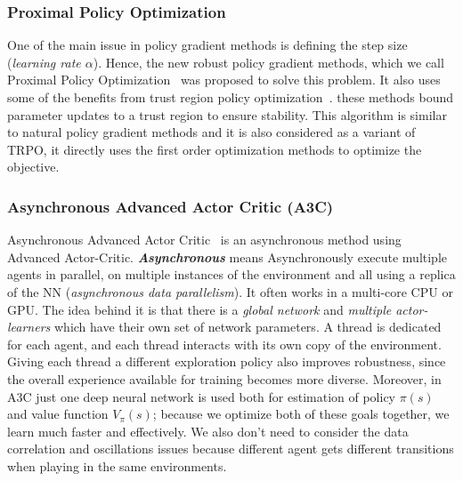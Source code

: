 \subsubsection{Proximal Policy Optimization}
One of the main issue in policy gradient methods is defining the step size (\textit{learning rate $\alpha$}). Hence, the new robust policy gradient methods, which we call Proximal Policy Optimization~\parencite{schulman2017proximal, heess2017emergence} was proposed to solve this problem. It also uses some of the benefits from trust region policy optimization~\parencite{schulman2015trust}. these methods bound parameter updates to a trust region to ensure stability.
This algorithm is similar to natural policy gradient methods and it is also considered as a variant of TRPO, it directly uses the first order optimization methods to optimize the objective.

\subsubsection{Asynchronous Advanced Actor Critic (\textbf{A3C})}
Asynchronous Advanced Actor Critic~\parencite{mnih2016asynchronous} is an asynchronous method using Advanced Actor-Critic. \textit{\textbf{Asynchronous}} means Asynchronously execute multiple agents in parallel, on multiple instances of the environment and all using a replica of the NN (\textit{asynchronous data parallelism}). It often works in a multi-core CPU or GPU. The idea behind it is that there is a \textit{global network} and \textit{multiple actor-learners} which have their own set of network parameters. A thread is dedicated for each agent, and each thread interacts with its own copy of the environment.
Giving each thread a different exploration policy also improves robustness, since the overall experience available for training becomes more diverse. Moreover, in A3C just one deep neural network is used both for estimation of policy $\pi(s)$ and value function $V_{\pi}(s)$; because we optimize both of these goals together, we learn much faster and effectively. We also don’t need to consider the data correlation and oscillations issues because different agent gets different transitions when playing in the same environments.

% 


